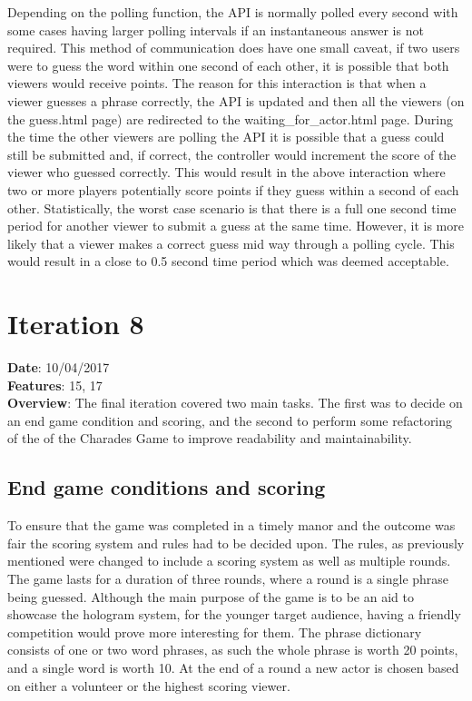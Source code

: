 Depending on the polling function, the API is normally polled every second with some cases having larger polling intervals if  an instantaneous answer is not required. This method of communication does have one small caveat, if two users were to guess the word within one second of each other, it is possible that both viewers would receive points. The reason for this interaction is that when a viewer guesses a phrase correctly, the API is updated and then all the viewers (on the guess.html page) are redirected to the waiting\_for\_actor.html page. During the time the other viewers are polling the API it is possible that a guess could still be submitted and, if correct, the controller would increment the score of the viewer who guessed correctly. This would result in the above interaction where two or more players potentially score points if they guess within a second of each other. Statistically, the worst case scenario is that there is a full one second time period for another viewer to submit a guess at the same time. However, it is more likely that a viewer makes a correct guess mid way through a polling cycle. This would result in a close to 0.5 second time period which was deemed acceptable.

\newpage

\section{Iteration 8}
\textbf{Date}: 10/04/2017 \\
\textbf{Features}: 15, 17 \\
\textbf{Overview}: The final iteration covered two main tasks. The first was to decide on an end game condition and scoring, and the second to perform some refactoring of the of the Charades Game to improve readability and maintainability.

\subsection{End game conditions and scoring}
To ensure that the game was completed in a timely manor and the outcome was fair the scoring system and rules had to be decided upon. The rules, as previously mentioned were changed to include a scoring system as well as multiple rounds. The game lasts for a duration of three rounds, where a round is a single phrase being guessed. Although the main purpose of the game is to be an aid to showcase the hologram system, for the younger target audience, having a friendly competition would prove more interesting for them. The phrase dictionary consists of one or two word phrases, as such the whole phrase is worth 20 points, and a single word is worth 10. At the end of a round a new actor is chosen based on either a volunteer or the highest scoring viewer.

